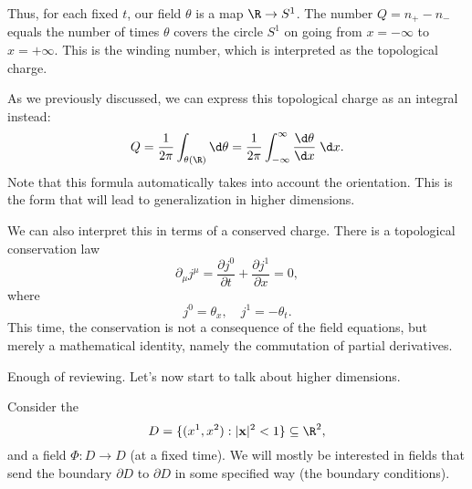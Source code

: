 \documentclass[a4paper]{article}
\begin{document}
Thus, for each fixed $t$, our field $\theta$ is a map $\R \to S^1$. The number $Q = n_+ - n_-$ equals the number of times $\theta$ covers the circle $S^1$ on going from $x = -\infty$ to $x = +\infty$. This is the winding number, which is interpreted as the topological charge.

As we previously discussed, we can express this topological charge as an integral instead:
\[
  Q = \frac{1}{2\pi} \int_{\theta(\R)} \d \theta = \frac{1}{2\pi} \int_{-\infty}^\infty \frac{\d \theta}{\d x}\;\d x.
\]
Note that this formula automatically takes into account the orientation. This is the form that will lead to generalization in higher dimensions. 

We can also interpret this in terms of a conserved charge. There is a topological conservation law
\[
  \partial_\mu j^\mu = \frac{\partial j^0}{\partial t} + \frac{\partial j^1}{\partial x} = 0,
\]
where
\[
  j^0 = \theta_x,\quad j^1 = -\theta_t.
\]
This time, the conservation is not a consequence of the field equations, but merely a mathematical identity, namely the commutation of partial derivatives.

Enough of reviewing. Let's now start to talk about higher dimensions.

Consider the 
\[
  D = \{(x^1, x^2): |\mathbf{x}|^2 < 1\} \subseteq \R^2,
\]
and a field $\Phi: D \to D$ (at a fixed time). We will mostly be interested in fields that send the boundary $\partial D$ to $\partial D$ in some specified way (the boundary conditions).
\end{document}
